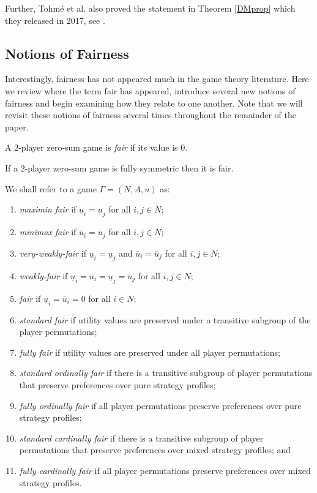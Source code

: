 Further, Tohm\'{e} et al. also proved the statement in Theorem \ref{DMprop} which they released in 2017, see \cite[Lemma 2.14]{tohme2019structural}.

\subsection{Notions of Fairness} \label{subsec:labeldepnotionsoffairness}
Interestingly, fairness has not appeared much in the game theory literature. Here we review where the term fair has appeared, introduce several new notions of fairness and begin examining how they relate to one another. Note that we will revisit these notions of fairness several times throughout the remainder of the paper.

\begin{definition}
	A $2$-player zero-sum game is \textit{fair} \cite[17.11, 28.1, 28.2]{VNM} if its value is $0$.
\end{definition}

\begin{proposition} 
	\cite{VNM} If a $2$-player zero-sum game is fully symmetric then it is fair. 
\end{proposition}

\begin{definition}
	We shall refer to a game $\Gamma = (N, A, u)$ as:
	\begin{enumerate}
		\item \textit{maximin fair} if $\underline{u}_i = \underline{u}_j$ for all $i, j \in N$;
		\item \textit{minimax fair} if $\overline{u}_i = \overline{u}_j$ for all $i, j \in N$;
		\item \textit{very-weakly-fair} if $\underline{u}_i = \underline{u}_j$ and $\overline{u}_i = \overline{u}_j$ for all $i, j \in N$;
		\item \textit{weakly-fair} if $\underline{u}_i = \overline{u}_i = \underline{u}_j = \overline{u}_j$ for all $i, j \in N$; 
		\item \textit{fair} if $\underline{u}_i = \overline{u}_i = 0$ for all $i \in N$;
		\item \textit{standard fair} if utility values are preserved under a transitive subgroup of the player permutations;
		\item \textit{fully fair} if utility values are preserved under all player permutations;
		\item \textit{standard ordinally fair} if there is a transitive subgroup of player permutations that preserve preferences over pure strategy profiles;
		\item \textit{fully ordinally fair} if all player permutations preserve preferences over pure strategy profiles;
		\item \textit{standard cardinally fair} if there is a transitive subgroup of player permutations that preserve preferences over mixed strategy profiles; and
		\item \textit{fully cardinally fair} if all player permutations preserve preferences over mixed strategy profiles.
	\end{enumerate}
\end{definition}

